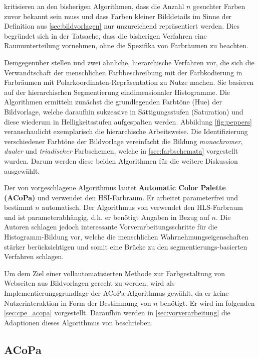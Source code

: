 \citet{acopa} kritisieren an den bisherigen Algorithmen, dass die Anzahl $n$ gesuchter Farben zuvor bekannt sein muss und dass Farben kleiner Bilddetails im Sinne der Definition aus \ref{sec:bildvorlagen} nur unzureichend repräsentiert werden. Dies begründet sich in der Tatsache, dass die bisherigen Verfahren eine Raumunterteilung vornehmen, ohne die Spezifika von Farbräumen zu beachten.

Demgegenüber stellen \citet{acopa} und \citet{image-based-schemes} zwei ähnliche, hierarchische Verfahren vor, die sich die Verwandtschaft der menschlichen Farbbeschreibung mit der Farbkodierung in Farbräumen mit Polarkoordinaten-Repräsentation zu Nutze machen. Sie basieren auf der hierarchischen Segmentierung eindimensionaler Histogramme. Die Algorithmen ermitteln zunächst die grundlegenden Farbtöne (Hue) der Bildvorlage, welche daraufhin sukzessive in Sättigungsstufen (Saturation) und diese wiederum in Helligkeitsstufen aufgespalten werden. Abbildung \ref{fig:peppers} veranschaulicht exemplarisch die hierarchische Arbeitsweise. Die Identifizierung verschiedener Farbtöne der Bildvorlage vereinfacht die Bildung \emph{monochromer}, \emph{dualer} und \emph{triadischer} Farbschemen, welche in \autoref{sec:farbschemata} vorgestellt wurden. Darum werden diese beiden Algorithmen für die weitere Diskussion ausgewählt.

Der von \citet{acopa} vorgeschlagene Algorithmus lautet  \textbf{Automatic Color Palette (ACoPa)} und verwendet den HSI-Farbraum. Er arbeitet parameterfrei und bestimmt $n$ automatisch. Der Algorithmus von \citet{image-based-schemes} verwendet den HLS-Farbraum und ist parameterabhängig, d.h. er benötigt Angaben in Bezug auf $n$. Die Autoren schlagen jedoch interessante Vorverarbeitungsschritte für die Histogramm-Bildung vor, welche die menschlichen Wahrnehmungseigenschaften stärker berücksichtigen und somit eine Brücke zu den segmentierungs-basierten Verfahren schlagen.

Um dem Ziel einer vollautomatisierten Methode zur Farbgestaltung von Webseiten aus Bildvorlagen gerecht zu werden, wird als Implementierungsgrundlage der ACoPa-Algorithmus gewählt, da er keine Nutzerinteraktion in Form der Bestimmung von $n$ benötigt. Er wird im folgenden \autoref{sec:cpe_acopa} vorgestellt. Daraufhin werden in \autoref{sec:vorverarbeitung} die Adaptionen dieses Algorithmus von \citet{image-based-schemes} beschrieben.



\subsection{ACoPa}
\label{sec:cpe_acopa}

